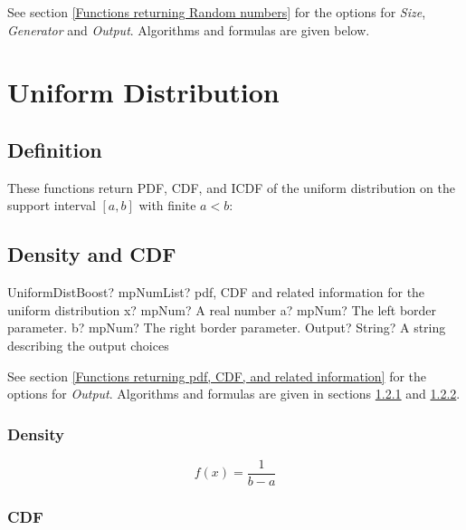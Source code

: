 \vspace{0.3cm}

See section \ref{Functions returning Random numbers} for the options for  {\itshape\sffamily Size},  {\itshape\sffamily Generator} and {\itshape\sffamily Output}. Algorithms and formulas are given below.




\newpage
\section{Uniform Distribution}

\subsection{Definition}
These functions return PDF, CDF, and ICDF of the uniform distribution on the support
interval $[a, b]$ with finite $a < b$:



\subsection{Density and CDF}
\begin{mpFunctionsExtract}
	\mpFunctionFourNotImplemented
	{UniformDistBoost? mpNumList? pdf, CDF and related information for the uniform distribution}
	{x? mpNum? A real number}
	{a? mpNum? The left border parameter.}
	{b? mpNum? The right border parameter.}
	{Output? String? A string describing the output choices}
\end{mpFunctionsExtract}

\vspace{0.3cm}
See section \ref{Functions returning pdf, CDF, and related information} for the options for {\itshape\sffamily Output}. Algorithms and formulas are given in sections \ref{UniformDistributionDensity} and \ref{UniformDistributionCDF}.

\subsubsection{Density}
\label{UniformDistributionDensity}

\begin{equation} 
	f(x)=\frac{1}{b-a}
\end{equation}


\subsubsection{CDF}
\label{UniformDistributionCDF}

